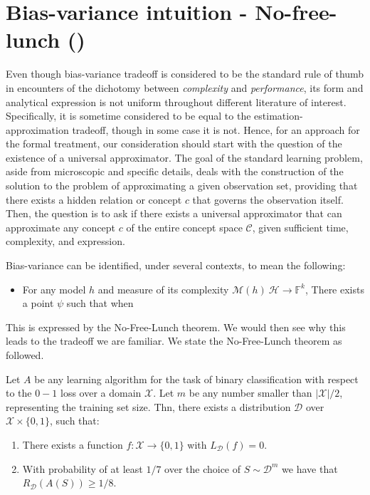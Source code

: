 \documentclass[10pt]{article}
\begin{document}
\clearpage
\section{Bias-variance intuition - No-free-lunch (\cite{10.5555/2371238})}

Even though bias-variance tradeoff is considered to be the standard rule of thumb in encounters of the dichotomy between \textit{complexity} and \textit{performance}, its form and analytical expression is not uniform throughout different literature of interest. Specifically, it is sometime considered to be equal to the estimation-approximation tradeoff, though in some case it is not. Hence, for an approach for the formal treatment, our consideration should start with the question of the existence of a universal approximator. The goal of the standard learning problem, aside from microscopic and specific details, deals with the construction of the solution to the problem of approximating a given observation set, providing that there exists a hidden relation or concept $c$ that governs the observation itself. Then, the question is to ask if there exists a universal approximator that can approximate any concept $c$ of the entire concept space $\mathcal{C}$, given sufficient time, complexity, and expression. 

\begin{conjecture}
    Bias-variance can be identified, under several contexts, to mean the following: \begin{itemize}
        \item For any model $h$ and measure of its complexity $\mathcal{M}(h)\:\mathcal{H}\to \mathbb{F}^{k}$, There exists a point $\psi$ such that when
    \end{itemize}
\end{conjecture}

This is expressed by the No-Free-Lunch theorem. We would then see why this leads to the tradeoff we are familiar. We state the No-Free-Lunch theorem as followed.

\begin{theorem}
    Let $A$ be any learning algorithm for the task of binary classification with respect to the $0-1$ loss over a domain $\mathcal{X}$. Let $m$ be any number smaller than $|\mathcal{X}|/2$, representing the training set size. Thn, there exists a distribution $\mathcal{D}$ over $\mathcal{X}\times \{0,1\}$, such that: 
    \begin{enumerate}
        \item There exists a function $f:\mathcal{X}\to \{0,1\}$ with $L_{\mathcal{D}}(f)= 0$. 
        \item With probability of at least $1/7$ over the choice of $S\sim \mathcal{D}^{m}$ we have that $R_{\mathcal{D}}(A(S))\geq 1/8$. 
    \end{enumerate}
\end{theorem}
\end{document}
